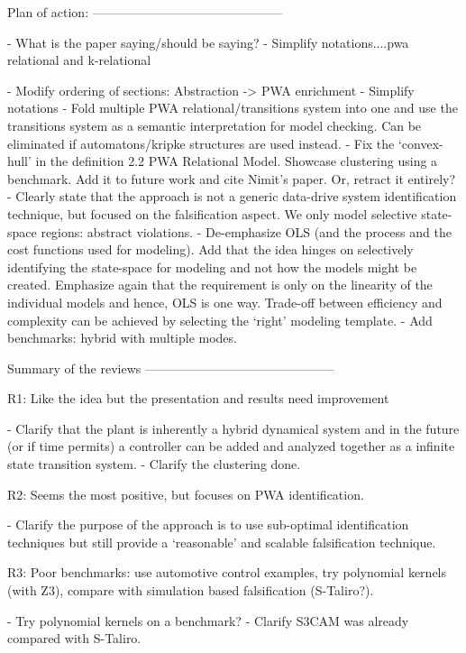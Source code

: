 Plan of action:
---------------------------------------------

- What is the paper saying/should be saying?
- Simplify notations....pwa relational and k-relational



- Modify ordering of sections: Abstraction -> PWA enrichment
- Simplify notations
- Fold multiple PWA relational/transitions system into one and use the
  transitions system as a semantic interpretation for model checking.
  Can be eliminated if automatons/kripke structures are used instead.
- Fix the `convex-hull' in the definition 2.2 PWA Relational Model.
  Showcase clustering using a benchmark. Add it to future work
  and cite Nimit's  paper. Or, retract it entirely?
- Clearly state that the approach is not a generic data-drive system
  identification technique, but focused on the falsification aspect.
  We only model selective state-space regions: abstract violations.
- De-emphasize OLS (and the process and the cost functions used for
  modeling). Add that the idea hinges on selectively identifying the
  state-space for modeling and not how the models might be created.
  Emphasize again that the requirement is only on the linearity of
  the individual models and hence, OLS is one way. Trade-off between
  efficiency and complexity can be achieved by selecting the `right'
  modeling template.
- Add benchmarks: hybrid with multiple modes.

Summary of the reviews
---------------------------------------------

R1: Like the idea but the presentation and results need improvement

- Clarify that the plant is inherently a hybrid dynamical system
  and in the future (or if time permits) a controller can be added and
  analyzed together as a infinite state transition system.
- Clarify the clustering done.


R2: Seems the most positive, but focuses on PWA identification.

- Clarify the purpose of the approach is to use sub-optimal
  identification techniques but still provide a `reasonable' and
  scalable falsification technique.

R3: Poor benchmarks: use automotive control examples, try
polynomial kernels (with Z3), compare with simulation based
falsification (S-Taliro?).

- Try polynomial kernels on a benchmark?
- Clarify S3CAM was already compared with S-Taliro.

